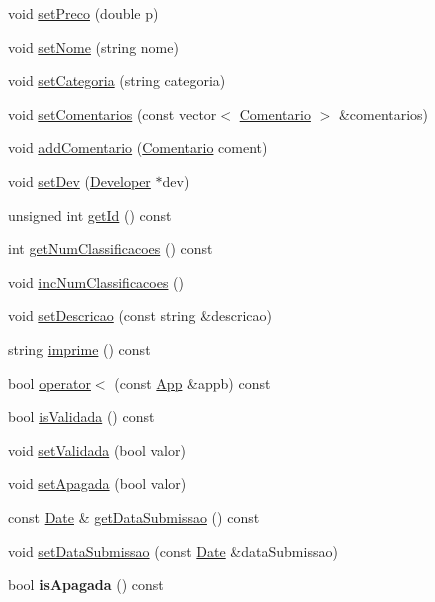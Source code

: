 \begin{DoxyCompactItemize}
\item 
void \hyperlink{class_app_ab9723a9ef1383d41b9960e07de4c5691}{set\+Preco} (double p)
\item 
void \hyperlink{class_app_a779936463595bd7babe3fabdd3b81530}{set\+Nome} (string nome)
\item 
void \hyperlink{class_app_add85e6926cb052edac84f210889df476}{set\+Categoria} (string categoria)
\item 
void \hyperlink{class_app_a40d8afcc9663054f4f5445a37dfd542d}{set\+Comentarios} (const vector$<$ \hyperlink{class_comentario}{Comentario} $>$ \&comentarios)
\item 
void \hyperlink{class_app_a4291a68b048c4976186ac2dc58062873}{add\+Comentario} (\hyperlink{class_comentario}{Comentario} coment)
\item 
void \hyperlink{class_app_aa2d4de1233b4a07def3cdae0d165d4cf}{set\+Dev} (\hyperlink{class_developer}{Developer} $\ast$dev)
\item 
unsigned int \hyperlink{class_app_a17d1e4e52f2357b25437d21d21728bcb}{get\+Id} () const 
\item 
int \hyperlink{class_app_afca72f5119a5fbb1c7972d8085abc2c7}{get\+Num\+Classificacoes} () const 
\item 
void \hyperlink{class_app_ada474e2840fd5ca144dc6d5d61c55460}{inc\+Num\+Classificacoes} ()
\item 
void \hyperlink{class_app_af0140ea32801ddf481e61fda65024ba8}{set\+Descricao} (const string \&descricao)
\item 
string \hyperlink{class_app_af3a98845da9ba10769df22e1e21f3db0}{imprime} () const 
\item 
bool \hyperlink{class_app_a89d6515b1a73716dabbcfb258ddf2783}{operator$<$} (const \hyperlink{class_app}{App} \&appb) const 
\item 
bool \hyperlink{class_app_aa87b9e6cd0099a036cf4ecbc4171bc45}{is\+Validada} () const 
\item 
void \hyperlink{class_app_a2c1495ff54cef5545d16cf44a697eb7c}{set\+Validada} (bool valor)
\item 
void \hyperlink{class_app_aaf85b111c1b1b925d036387902da5a69}{set\+Apagada} (bool valor)
\item 
const \hyperlink{class_date}{Date} \& \hyperlink{class_app_a9e89fa62862113c197e4e05c55e6e5ec}{get\+Data\+Submissao} () const 
\item 
void \hyperlink{class_app_a89712d5de34c065566dbcb90cfe6d316}{set\+Data\+Submissao} (const \hyperlink{class_date}{Date} \&data\+Submissao)
\item 
\hypertarget{class_app_ad3df8fe2a598ca2d52c9a6e491a693e7}{bool {\bfseries is\+Apagada} () const }\label{class_app_ad3df8fe2a598ca2d52c9a6e491a693e7}

\end{DoxyCompactItemize}
